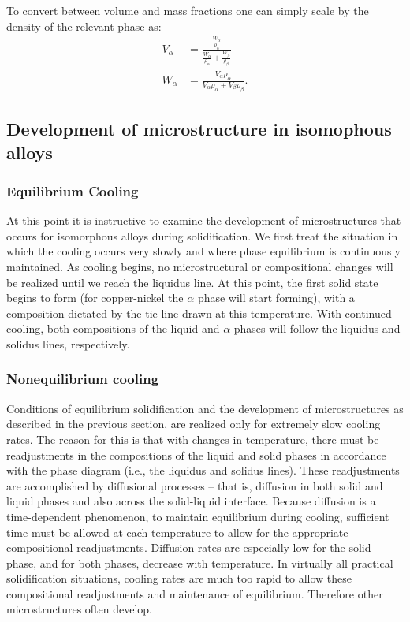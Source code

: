 To convert between volume and mass fractions one can simply scale by the density of the relevant phase as:
\begin{align*}
  V_{\alpha} &= \frac{\frac{W_{\alpha}}{\rho_{\alpha}}}{\frac{W_{\alpha}}{\rho_{\alpha}} + \frac{W_{\beta}}{\rho_{\beta}}} \\
  W_{\alpha} &= \frac{V_{\alpha} \rho_{\alpha}}{V_{\alpha}\rho_{\alpha} + V_{\beta} \rho_{\beta}}
.\end{align*}


\subsection{Development of microstructure in isomophous alloys}

\subsubsection{Equilibrium Cooling}
At this point it is instructive to examine the development of microstructures that occurs for isomorphous alloys during solidification. We first treat the situation in which the cooling occurs very slowly and where phase equilibrium is continuously maintained. As cooling begins, no microstructural or compositional changes will be realized until we reach the liquidus line. At this point, the first solid state begins to form (for copper-nickel the $\alpha$ phase will start forming), with a composition dictated by the tie line drawn at this temperature. With continued cooling, both compositions of the liquid and $\alpha$ phases will follow the liquidus and solidus lines, respectively.


\subsubsection{Nonequilibrium cooling}
Conditions of equilibrium solidification and the development of microstructures as described in the previous section, are realized only for extremely slow cooling rates. The reason for this is that with changes in temperature, there must be readjustments in the compositions of the liquid and solid phases in accordance with the phase diagram (i.e., the liquidus and solidus lines). These readjustments are accomplished by diffusional processes -- that is, diffusion in both solid and liquid phases and also across the solid-liquid interface. Because diffusion is a time-dependent phenomenon, to maintain equilibrium during cooling, sufficient time must be allowed at each temperature to allow for the appropriate compositional readjustments. Diffusion rates are especially low for the solid phase, and for both phases, decrease with temperature. In virtually all practical solidification situations, cooling rates are much too rapid to allow these compositional readjustments and maintenance of equilibrium. Therefore other microstructures often develop.

